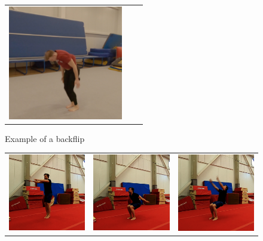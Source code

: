 \begin{figure}
\begin{tabular}{ccc}
\includegraphics[width=5cm]{images/data-acquisition/example-backflip-part-6}\\
\end{tabular}
    \caption{Example of a backflip}
    \label{example-of-backflip}
\end{figure}

\begin{figure}
   \centering
\begin{tabular}{ccc}
\includegraphics[width=5cm]{images/data-acquisition/example-flack-part-1}&
\includegraphics[width=5cm]{images/data-acquisition/example-flack-part-2}&
\includegraphics[width=5cm]{images/data-acquisition/example-flack-part-3}\\

\end{tabular}
\end{figure}
